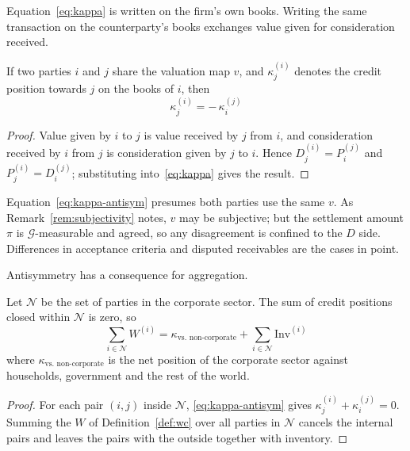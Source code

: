 Equation~\eqref{eq:kappa} is written on the firm's own books. Writing the same transaction
on the counterparty's books exchanges value given for consideration received.

\begin{proposition}[Antisymmetry]
\label{prop:kappa-antisym}
If two parties $i$ and $j$ share the valuation map $v$, and $\kappa_j^{(i)}$ denotes the
credit position towards $j$ on the books of $i$, then
\begin{equation}
\kappa_j^{(i)} = -\,\kappa_i^{(j)}
\label{eq:kappa-antisym}
\end{equation}
\end{proposition}

\begin{proof}
Value given by $i$ to $j$ is value received by $j$ from $i$, and consideration received by
$i$ from $j$ is consideration given by $j$ to $i$. Hence $D_j^{(i)}=P_i^{(j)}$ and
$P_j^{(i)}=D_i^{(j)}$; substituting into~\eqref{eq:kappa} gives the result.
\end{proof}

\begin{remark}
Equation~\eqref{eq:kappa-antisym} presumes both parties use the same $v$. As
Remark~\ref{rem:subjectivity} notes, $v$ may be subjective; but the settlement amount $\pi$
is $\mathcal{G}$-measurable and agreed, so any disagreement is confined to the $D$ side.
Differences in acceptance criteria and disputed receivables are the cases in point.
\end{remark}

Antisymmetry has a consequence for aggregation.

\begin{corollary}
\label{cor:kappa-nets-out}
Let $\mathcal{N}$ be the set of parties in the corporate sector. The sum of credit positions
closed within $\mathcal{N}$ is zero, so
\begin{equation}
\sum_{i\in\mathcal{N}} W^{(i)}
= \kappa_{\text{vs.\ non-corporate}} + \sum_{i\in\mathcal{N}}\mathrm{Inv}^{(i)}
\label{eq:aggregate-W}
\end{equation}
where $\kappa_{\text{vs.\ non-corporate}}$ is the net position of the corporate sector
against households, government and the rest of the world.
\end{corollary}

\begin{proof}
For each pair $(i,j)$ inside $\mathcal{N}$, \eqref{eq:kappa-antisym} gives
$\kappa_j^{(i)}+\kappa_i^{(j)}=0$. Summing the $W$ of Definition~\ref{def:wc} over all
parties in $\mathcal{N}$ cancels the internal pairs and leaves the pairs with the outside
together with inventory.
\end{proof}

